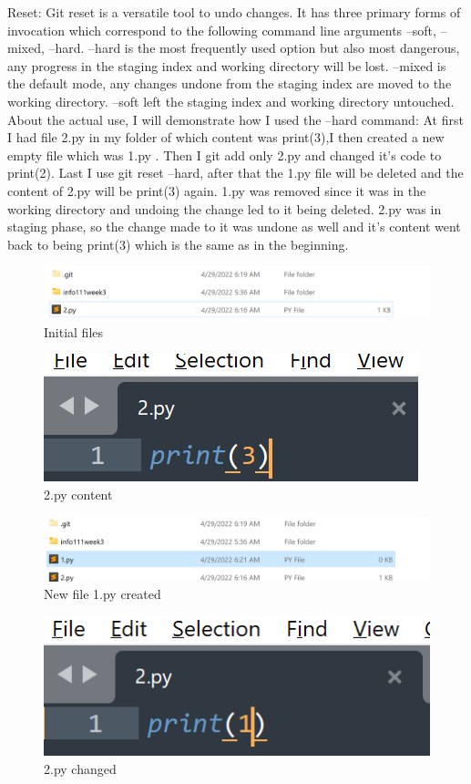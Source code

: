 \documentclass[a4paper, 11pt]{report}
\begin{document}
Reset: Git reset is a versatile tool to undo changes. It has three primary forms of invocation which correspond to the following command line arguments --soft, --mixed, --hard. --hard is the most frequently used option but also most dangerous, any progress in the staging index and working directory will be lost. --mixed is the default mode, any changes undone from the staging index  are moved to  the working directory. --soft left the staging index and working directory untouched.
About the actual use, I will demonstrate how I used the –hard command: At first I had file 2.py in my folder of which content was print(3),I then created a new empty file which was 1.py . Then I git add only 2.py and changed it's code to print(2). Last I use git reset –hard, after that the 1.py file will be deleted and the content of 2.py will be print(3) again.
1.py was removed since it was in the working directory and undoing the change led to it being deleted. 2.py was in staging phase, so the change made to it was undone as well and it’s content went back to being print(3) which is the same as in the beginning.

\begin{figure}[!h]
\centering
\includegraphics[width=0.45\columnwidth]{Picture2.png}
\caption{Initial files}
\label{fig}
\end{figure}

\begin{figure}[!h]
\centering
\includegraphics[width=0.45\columnwidth]{Picture3.png}
\caption{2.py content}
\label{fig}
\end{figure}

\begin{figure}[!h]
\centering
\includegraphics[width=0.45\columnwidth]{Picture4.png}
\caption{New file 1.py created}
\label{fig}
\end{figure}

\begin{figure}[!h]
\centering
\includegraphics[width=0.45\columnwidth]{Picture5.png}
\caption{2.py changed}
\label{fig}
\end{figure}
\end{document}

